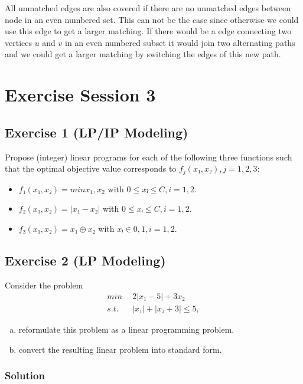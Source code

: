 \documentclass[a4paper, 12pt]{report}
\begin{document}
All unmatched edges are also covered if there are no unmatched edges between
node in an even numbered set. This can not be the case since otherwise we could
use this edge to get a larger matching. If there would be a edge connecting two
vertices $u$ and $v$ in an even numbered subset it would join two alternating
paths and we could get a larger matching by switching the edges of this new
path.

\chapter{Exercise Session 3}

\section{Exercise 1 (LP/IP Modeling)}

Propose (integer) linear programs for each of the following three functions
such that the optimal objective value corresponds to $f_j(x₁,x₂), j = 1,2,3$:

\begin{itemize}
    \item $f₁(x₁, x₂) = min{x_1,x_2}$ with $0 ≤ xᵢ ≤ C, i = 1,2$.
    \item $f₂(x₁, x₂) = |x₁ − x₂|$ with $0 ≤ xᵢ ≤ C, i = 1, 2$.
    \item $f₃(x₁, x₂) = x₁ ⊕ x₂$ with $xᵢ ∈ {0, 1}, i = 1, 2$.
\end{itemize}

\section{Exercise 2 (LP Modeling)}

Consider the problem
\begin{align*}
    min  ~&~ 2|x₁ − 5| + 3x₂\\
    s.t. ~&~ |x₁| + |x₂ + 3| ≤ 5,
\end{align*}

\begin{enumerate}[a)]
    \item reformulate this problem as a linear programming problem.
    \item convert the resulting linear problem into standard form.
\end{enumerate}

\subsection{Solution}
\end{document}
